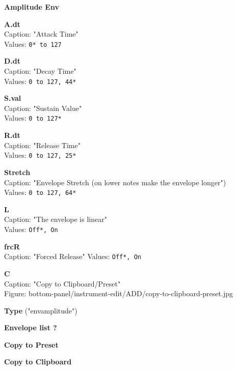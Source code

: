 \documentclass[
 11pt,
 twoside,
 a4paper,
 headinclude,
 footinclude,
 final                                 %
]{article}
\begin{document}
\begin{enumber}
\begin{enumber}
\begin{enumber}
\begin{enumber}
            \item \textbf{Amplitude Env}
            \begin{enumber}
               \item \textbf{A.dt} \\
                  Caption: "Attack Time" \\
                  Values: \texttt{0* to 127}
               \item \textbf{D.dt} \\
                  Caption: "Decay Time" \\
                  Values: \texttt{0 to 127, 44*}
               \item \textbf{S.val} \\
                  Caption: "Sustain Value" \\
                  Values: \texttt{0 to 127*}
               \item \textbf{R.dt} \\
                  Caption: "Release Time" \\
                  Values: \texttt{0 to 127, 25*}
               \item \textbf{Stretch} \\
                  Caption: "Envelope Stretch (on lower notes make the envelope longer") \\
                  Values: \texttt{0 to 127, 64*}
               \item \textbf{L} \\
                  Caption: "The envelope is linear" \\
                  Values: \texttt{Off*, On}
               \item \textbf{frcR} \\
                  Caption: "Forced Release"
                  Values: \texttt{Off*, On}
               \item \textbf{C} \\
                  Caption: "Copy to Clipboard/Preset" \\
                  Figure: bottom-panel/instrument-edit/ADD/copy-to-clipboard-preset.jpg
                  \begin{enumber}
                     \item \textbf{Type} ("envamplitude")
                     \item \textbf{Envelope list ?}
                     \item \textbf{Copy to Preset}
                     \item \textbf{Copy to Clipboard}

\end{enumber}
\end{enumber}
\end{enumber}
\end{enumber}
\end{enumber}
\end{enumber}
\end{document}
